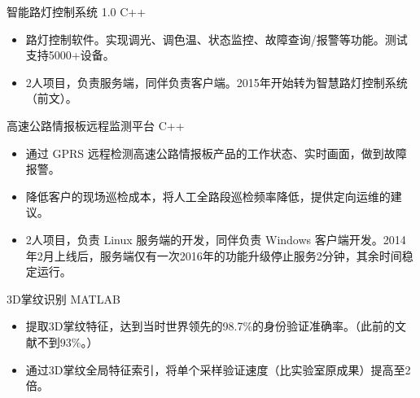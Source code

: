 \documentclass[11pt,a4paper]{moderncv/moderncv}
\begin{document}
{智能路灯控制系统 1.0}
{C++}
{}{}
{
\begin{itemize}
	\item 路灯控制软件。实现调光、调色温、状态监控、故障查询/报警等功能。测试支持5000+设备。
	\item 2人项目，负责服务端，同伴负责客户端。2015年开始转为智慧路灯控制系统（前文）。
\end{itemize}
}

{高速公路情报板远程监测平台}
{C++}
{}{}
{
\begin{itemize}
	\item 通过 GPRS 远程检测高速公路情报板产品的工作状态、实时画面，做到故障报警。
	\item 降低客户的现场巡检成本，将人工全路段巡检频率降低，提供定向运维的建议。
	\item 2人项目，负责 Linux 服务端的开发，同伴负责 Windows 客户端开发。2014年2月上线后，服务端仅有一次2016年的功能升级停止服务2分钟，其余时间稳定运行。
\end{itemize}
}




{3D掌纹识别}
{MATLAB}
{}{}
{
\begin{itemize}
	\item 提取3D掌纹特征，达到当时世界领先的98.7\%的身份验证准确率。（此前的文献不到93\%。）
	\item 通过3D掌纹全局特征索引，将单个采样验证速度（比实验室原成果）提高至2倍。
\end{itemize}
}

\end{document}
